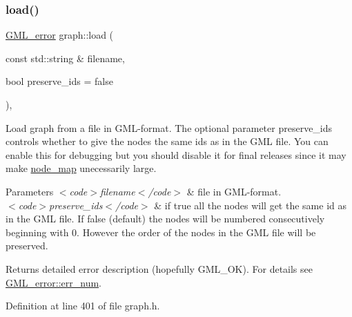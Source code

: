 \subsubsection{\texorpdfstring{load()}{load()}\hspace{0.1cm}{\footnotesize\ttfamily [1/2]}}
{\footnotesize\ttfamily \mbox{\hyperlink{struct_g_m_l__error}{G\+M\+L\+\_\+error}} graph\+::load (\begin{DoxyParamCaption}\item[{const std\+::string \&}]{filename,  }\item[{bool}]{preserve\+\_\+ids = {\ttfamily false} }\end{DoxyParamCaption})\hspace{0.3cm}{\ttfamily [inline]}, {\ttfamily [inherited]}}

Load graph from a file in G\+M\+L-\/format. The optional parameter {\ttfamily preserve\+\_\+ids} controls whether to give the nodes the same ids as in the G\+ML file. You can enable this for debugging but you should disable it for final releases since it may make {\ttfamily \mbox{\hyperlink{classnode__map}{node\+\_\+map}}} unecessarily large. ~\newline
 
\begin{DoxyParams}{Parameters}
{\em $<$code$>$filename$<$/code$>$} & file in G\+M\+L-\/format. ~\newline
\\
\hline
{\em $<$code$>$preserve\+\_\+ids$<$/code$>$} & if true all the nodes will get the same id as in the G\+ML file. If false (default) the nodes will be numbered consecutively beginning with 0. However the order of the nodes in the G\+ML file will be preserved. \\
\hline
\end{DoxyParams}
\begin{DoxyReturn}{Returns}
detailed error description (hopefully G\+M\+L\+\_\+\+OK). For details see \mbox{\hyperlink{struct_g_m_l__error_a66fe2c5a3d2d40e77ff486007dfe7f76}{G\+M\+L\+\_\+error\+::err\+\_\+num}}. 
\end{DoxyReturn}


Definition at line 401 of file graph.\+h.


